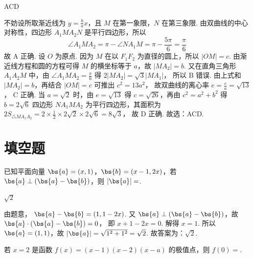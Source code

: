 \documentclass[UTF8,a4paper,oneside,11pt]{ctexbook}
\begin{document}
\begin{answer}
ACD
\end{answer}

\begin{solution}
不妨设所取渐近线为 \(y=\frac{b}{a}x\)，且 \(M\) 在第一象限，\(N\) 在第三象限.
由双曲线的中心对称性，四边形 \(A_1MA_2N\) 是平行四边形，所以
\[
\angle A_1MA_2=\pi-\angle NA_1M=\pi-\frac{5\pi}{6}=\frac{\pi}{6}
\]
故 A 正确.
设 \(O\) 为原点. 因为 \(M\) 在以 \(F_1F_2\) 为直径的圆上，所以 \(|OM|=c\). 由渐近线方程和圆的方程可得 \(M\) 的横坐标等于 \(a\)，故 \(|MA_2|=b\). 又在直角三角形 \(A_1A_2M\) 中，由 \(\angle A_1MA_2=\frac{\pi}{6}\) 得
\(2|MA_2|=\sqrt3|MA_1|\)，
所以 B 错误.
由上式和 \(|MA_2|=b\)，再结合 \(|OM|=c\) 可推出
\(c^2=13a^2\)，
故双曲线的离心率
\(e=\frac{c}{a}=\sqrt{13}\)，
C 正确.
当 \(a=\sqrt2\) 时，由 \(e=\sqrt{13}\) 得 \(c=\sqrt{26}\)，再由 \(c^2=a^2+b^2\) 得
\(
b=2\sqrt6
\)
四边形 \(NA_1MA_2\) 为平行四边形，其面积为
\(
2S_{\triangle MA_1A_2}=2\times \frac12 \times 2\sqrt2 \times 2\sqrt6=8\sqrt3
\)，
故 D 正确. 故选：ACD.
\end{solution}
\section{填空题}

\begin{problem}
已知平面向量 \(\bs{a}=(x,1)\)，\(\bs{b}=(x-1,2x)\)，若 \(\bs{a}\perp(\bs{a}-\bs{b})\)，则 \(|\bs{a}|=\)\fillinblank{}.
\end{problem}

\begin{answer}
\(\sqrt2\)
\end{answer}

\begin{solution}
由题意，
\(\bs{a}-\bs{b}=(1,1-2x)\).
又 \(\bs{a}\perp(\bs{a}-\bs{b})\)，故
\(\bs{a}\cdot(\bs{a}-\bs{b})=0\)，
即
\(x+1-2x=0\).
解得 \(x=1\). 所以 \(\bs{a}=(1,1)\)，故
\(|\bs{a}|=\sqrt{1^2+1^2}=\sqrt2\).
故答案为：\(\sqrt2\).
\end{solution}

\begin{problem}
若 \(x=2\) 是函数 \(f(x)=(x-1)(x-2)(x-a)\) 的极值点，则 \(f(0)=\)\fillinblank{}.
\end{problem}
\end{document}
